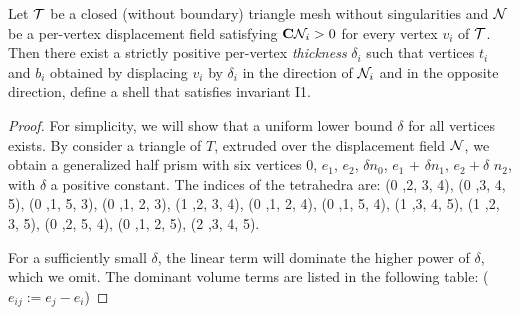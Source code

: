 \begin{proposition}\label{thm:I1}
Let $\mathcal{T}$ be a closed (without boundary) triangle mesh without singularities and $\mathcal{N}$ be a per-vertex displacement field satisfying $\mathbf{C} \mathcal{N}_i > 0$ for every vertex $v_i$ of $\mathcal{T}$. 
Then there exist a strictly positive per-vertex \emph{thickness} $\delta_i$ such that vertices $t_i$ and $b_i$ obtained by displacing $v_i$ by $\delta_i$ in the direction of $\mathcal{N}_i$ and in the opposite direction, define a shell that satisfies invariant I1.
\end{proposition}
\begin{proof}
    \label{app:I1}
    For simplicity, we will show that a uniform lower bound $\delta$ for all vertices exists. By consider a triangle of $T$, extruded over the displacement field $\mathcal{N}$, we obtain a generalized half prism with six vertices
    $0$, $e_1$, $e_2$, $\delta n_0$, $e_1$ + $\delta n_1$, $e_2 + \delta$ $n_2$, with $\delta$ a positive constant. The indices of the tetrahedra are:
    (0 ,2, 3, 4), 
    (0 ,3, 4, 5), 
    (0 ,1, 5, 3), 
    (0 ,1, 2, 3), 
    (1 ,2, 3, 4), 
    (0 ,1, 2, 4), 
    (0 ,1, 5, 4), 
    (1 ,3, 4, 5), 
    (1 ,2, 3, 5), 
    (0 ,2, 5, 4), 
    (0 ,1, 2, 5), 
    (2 ,3, 4, 5). 
    
    For a sufficiently small $\delta$, the linear term will dominate the higher power of $\delta$, which we omit. 
    The dominant volume terms are listed in the following table: ($e_{ij} := e_j - e_i$)
    

\end{proof}
